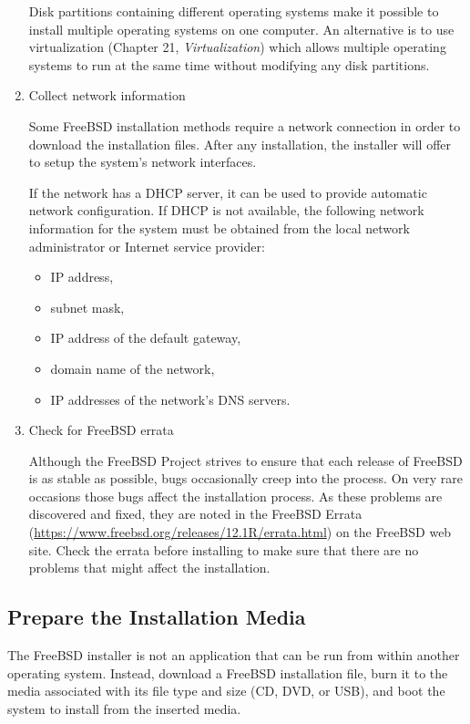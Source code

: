 \begin{enumerate}
   Disk partitions containing different operating systems make it possible to install multiple operating systems on one computer.
   An alternative is to use virtualization (Chapter 21, \emph{Virtualization}) which allows multiple operating systems to run at the same time without modifying any disk partitions.
\item    
   Collect network information

   Some FreeBSD installation methods require a network connection in order to download the installation files.
   After any installation, the installer will offer to setup the system's network interfaces.

   If the network has a DHCP server, it can be used to provide automatic network configuration.
   If DHCP is not available, the following network information for the system must be obtained from the local network administrator or Internet service provider:
   \begin{itemize}
   \item IP address,
   \item subnet mask,
   \item IP address of the default gateway,
   \item domain name of the network,
   \item IP addresses of the network's DNS servers.
   \end{itemize}
\item
   Check for FreeBSD errata

   Although the FreeBSD Project strives to ensure that each release of FreeBSD is as stable as possible, bugs occasionally creep into the process.
   On very rare occasions those bugs affect the installation process.
   As these problems are discovered and fixed, they are noted in the FreeBSD Errata (\url{https://www.freebsd.org/releases/12.1R/errata.html}) on the FreeBSD web site.
   Check the errata before installing to make sure that there are no problems that might affect the installation.
\end{enumerate}



\subsection{Prepare the Installation Media}

The FreeBSD installer is not an application that can be run from within another operating system.
Instead, download a FreeBSD installation file, burn it to the media associated with its file type and size (CD, DVD, or USB), and boot the system to install from the inserted media.

